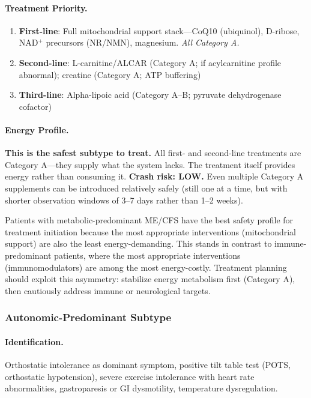 \paragraph{Treatment Priority.}
\begin{enumerate}
    \item \textbf{First-line}: Full mitochondrial support stack---CoQ10 (ubiquinol), D-ribose, NAD$^+$ precursors (NR/NMN), magnesium. \textit{All Category A.}
    \item \textbf{Second-line}: L-carnitine/ALCAR (Category A; if acylcarnitine profile abnormal); creatine (Category A; ATP buffering)
    \item \textbf{Third-line}: Alpha-lipoic acid (Category A--B; pyruvate dehydrogenase cofactor)
\end{enumerate}

\paragraph{Energy Profile.} \textbf{This is the safest subtype to treat.} All first- and second-line treatments are Category A---they supply what the system lacks. The treatment itself provides energy rather than consuming it. \textbf{Crash risk: LOW.} Even multiple Category A supplements can be introduced relatively safely (still one at a time, but with shorter observation windows of 3--7 days rather than 1--2 weeks).

\begin{observation}
Patients with metabolic-predominant ME/CFS have the best safety profile for treatment initiation because the most appropriate interventions (mitochondrial support) are also the least energy-demanding. This stands in contrast to immune-predominant patients, where the most appropriate interventions (immunomodulators) are among the most energy-costly. Treatment planning should exploit this asymmetry: stabilize energy metabolism first (Category A), then cautiously address immune or neurological targets.
\end{observation}

\subsubsection{Autonomic-Predominant Subtype}

\paragraph{Identification.} Orthostatic intolerance as dominant symptom, positive tilt table test (POTS, orthostatic hypotension), severe exercise intolerance with heart rate abnormalities, gastroparesis or GI dysmotility, temperature dysregulation.

